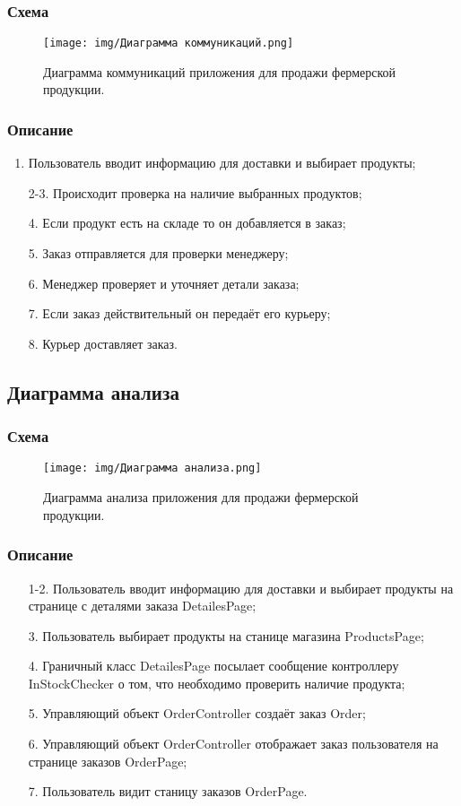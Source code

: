\documentclass[a4paper]{report}
\begin{document}
\subsubsection{Схема}
\begin{figure}[H]
    \centering
    \texttt{[image: img/Диаграмма коммуникаций.png]}
    \caption{Диаграмма коммуникаций приложения для продажи фермерской продукции.}
\end{figure}
\subsubsection{Описание}
\begin{enumerate}
    \item Пользователь вводит информацию для доставки и выбирает продукты;
    \item[2-3.] Происходит проверка на наличие выбранных продуктов;
    \item[4.] Если продукт есть на складе то он добавляется в заказ;
    \item[5.] Заказ отправляется для проверки менеджеру;
    \item[6.] Менеджер проверяет и уточняет детали заказа;
    \item[7.] Если заказ действительный он передаёт его курьеру;
    \item[8.] Курьер доставляет заказ.
\end{enumerate}

\newpage

\subsection{Диаграмма анализа}
\subsubsection{Схема}
\begin{figure}[H]
    \centering
    \texttt{[image: img/Диаграмма анализа.png]}
    \caption{Диаграмма анализа приложения для продажи фермерской продукции.}
\end{figure}
\subsubsection{Описание}
\begin{enumerate}
    \item[1-2.] Пользователь вводит информацию для доставки и выбирает продукты на странице с деталями заказа DetailesPage;
    \item[3.] Пользователь выбирает продукты на станице магазина ProductsPage;
    \item[4.] Граничный класс DetailesPage посылает сообщение контроллеру InStockChecker о том, что необходимо проверить наличие продукта;
    \item[5.] Управляющий объект OrderController создаёт заказ Order;
    \item[6.] Управляющий объект OrderController отображает заказ пользователя на странице заказов OrderPage;
    \item[7.] Пользователь видит станицу заказов OrderPage.
\end{enumerate}
\end{document}
